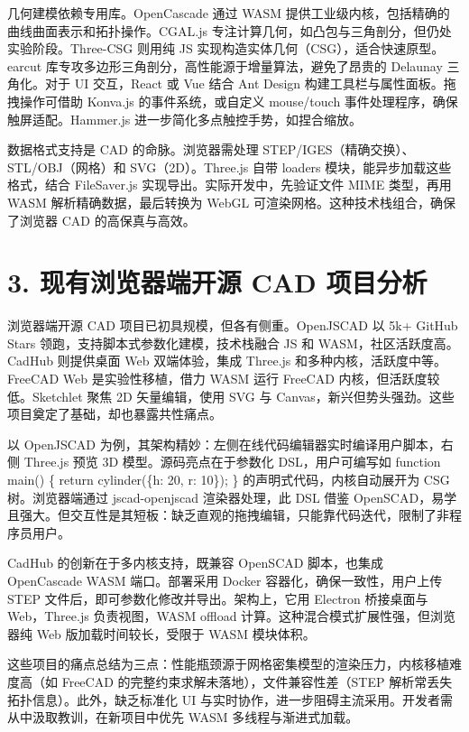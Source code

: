 几何建模依赖专用库。OpenCascade 通过 WASM 提供工业级内核，包括精确的曲线曲面表示和拓扑操作。CGAL.js 专注计算几何，如凸包与三角剖分，但仍处实验阶段。Three-CSG 则用纯 JS 实现构造实体几何（CSG），适合快速原型。earcut 库专攻多边形三角剖分，高性能源于增量算法，避免了昂贵的 Delaunay 三角化。对于 UI 交互，React 或 Vue 结合 Ant Design 构建工具栏与属性面板。拖拽操作可借助 Konva.js 的事件系统，或自定义 mouse/touch 事件处理程序，确保触屏适配。Hammer.js 进一步简化多点触控手势，如捏合缩放。\par
数据格式支持是 CAD 的命脉。浏览器需处理 STEP/IGES（精确交换）、STL/OBJ（网格）和 SVG（2D）。Three.js 自带 loaders 模块，能异步加载这些格式，结合 FileSaver.js 实现导出。实际开发中，先验证文件 MIME 类型，再用 WASM 解析精确数据，最后转换为 WebGL 可渲染网格。这种技术栈组合，确保了浏览器 CAD 的高保真与高效。\par
\chapter{3. 现有浏览器端开源 CAD 项目分析}
浏览器端开源 CAD 项目已初具规模，但各有侧重。OpenJSCAD 以 5k+ GitHub Stars 领跑，支持脚本式参数化建模，技术栈融合 JS 和 WASM，社区活跃度高。CadHub 则提供桌面 Web 双端体验，集成 Three.js 和多种内核，活跃度中等。FreeCAD Web 是实验性移植，借力 WASM 运行 FreeCAD 内核，但活跃度较低。Sketchlet 聚焦 2D 矢量编辑，使用 SVG 与 Canvas，新兴但势头强劲。这些项目奠定了基础，却也暴露共性痛点。\par
以 OpenJSCAD 为例，其架构精妙：左侧在线代码编辑器实时编译用户脚本，右侧 Three.js 预览 3D 模型。源码亮点在于参数化 DSL，用户可编写如 function main() \{{} return cylinder(\{{}h: 20, r: 10\}{}); \}{} 的声明式代码，内核自动展开为 CSG 树。浏览器端通过 jscad-openjscad 渲染器处理，此 DSL 借鉴 OpenSCAD，易学且强大。但交互性是其短板：缺乏直观的拖拽编辑，只能靠代码迭代，限制了非程序员用户。\par
CadHub 的创新在于多内核支持，既兼容 OpenSCAD 脚本，也集成 OpenCascade WASM 端口。部署采用 Docker 容器化，确保一致性，用户上传 STEP 文件后，即可参数化修改并导出。架构上，它用 Electron 桥接桌面与 Web，Three.js 负责视图，WASM offload 计算。这种混合模式扩展性强，但浏览器纯 Web 版加载时间较长，受限于 WASM 模块体积。\par
这些项目的痛点总结为三点：性能瓶颈源于网格密集模型的渲染压力，内核移植难度高（如 FreeCAD 的完整约束求解未落地），文件兼容性差（STEP 解析常丢失拓扑信息）。此外，缺乏标准化 UI 与实时协作，进一步阻碍主流采用。开发者需从中汲取教训，在新项目中优先 WASM 多线程与渐进式加载。\par
